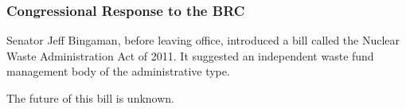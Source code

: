 \begin{frame}[ctb!]
    \frametitle{Congressional Response to the BRC}
    Senator Jeff Bingaman, before leaving office, introduced a bill called the 
    Nuclear Waste Administration Act of 2011. It suggested an independent waste 
    fund management body of the administrative type. 

    The future of this bill is unknown. 
  \end{frame}

